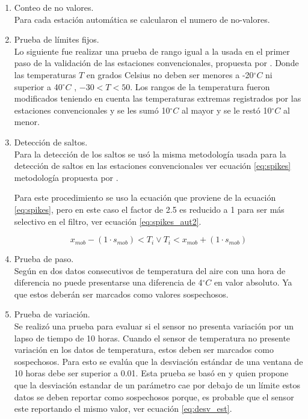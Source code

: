 \documentclass[11pt]{article}
\def\celc{$^{\circ}C$ }%
\begin{document}
\begin{enumerate}
\item Conteo de no valores.\\
	Para cada estación automática se calcularon el numero de no-valores. 

\item Prueba de límites fijos.\\
Lo siguiente fue realizar una prueba de rango igual a la usada en el primer paso de la validación de las estaciones convencionales, propuesta por \citet{estevez2011}. Donde las temperaturas $T$ en grados Celsius no deben ser menores a -20\celc ni superior a 40\celc, $-30 < T< 50$. Los rangos de la temperatura fueron modificados teniendo en cuenta las temperaturas extremas registrados por las estaciones convencionales y se les sumó 10\celc al mayor y se le restó 10\celc al menor. 

\item Detección de saltos.\\
Para la detección de los saltos se usó la misma metodología usada para la detección de saltos en las estaciones convencionales ver ecuación \ref{eq:spikes} metodología propuesta por \citet{vickers1997}.

Para este procedimiento se uso la ecuación que proviene de la ecuación \ref{eq:spikes}, pero en este caso el factor de 2.5 es reducido a 1 para ser más selectivo en el filtro, ver ecuación \ref{eq:spikes_aut2}.

\begin{equation}\label{eq:spikes_aut2}
	     x_{mob} - (1\cdot{s_{mob}}) < T_{i} \lor T_{i} < x_{mob} + (1\cdot{s_{mob}}) 
\end{equation}

\item Prueba de paso.\\
Según \citep{estevez2011} en dos datos consecutivos  de temperatura del aire con una hora de diferencia no puede presentarse una diferencia de 4\celc en valor absoluto. Ya que estos deberán ser marcados como valores sospechosos.\\

\item Prueba de variación.\\

Se realizó una prueba para evaluar si el sensor no presenta variación por un lapso de tiempo de 10 horas. Cuando el sensor de temperatura no presente variación en los datos de temperatura, estos deben ser marcados como sospechosos. Para esto se evalúa que la desviación estándar de una ventana de 10 horas debe ser superior a 0.01. Esta prueba  se basó en \citet{zahumensky2004} y \citet{Shafer2000} quien propone que la desviación estandar de un parámetro cae por debajo de un límite estos datos se deben reportar como sospechosos porque, es probable que el sensor este reportando el mismo valor, ver ecuación \ref{eq:desv_est}.


\end{enumerate}
\end{document}
